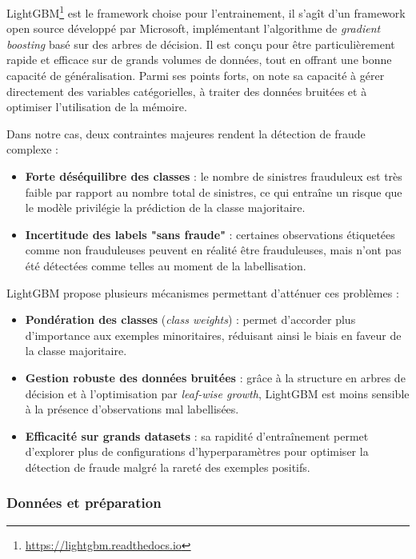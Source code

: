 \documentclass [twoside,openright,a4paper,11pt,french] {report}
\begin{document}
LightGBM\footnote{\url{https://lightgbm.readthedocs.io}} est le framework choise pour l'entrainement,
il s'agît d'un framework open source développé par Microsoft, implémentant l'algorithme de \textit{gradient boosting} 
basé sur des arbres de décision. Il est conçu pour être particulièrement rapide et efficace sur de grands volumes de données, 
tout en offrant une bonne capacité de généralisation. Parmi ses points forts, on note sa capacité à gérer directement des 
variables catégorielles, à traiter des données bruitées et à optimiser l'utilisation de la mémoire.

Dans notre cas, deux contraintes majeures rendent la détection de fraude complexe :
\begin{itemize}
    \item \textbf{Forte déséquilibre des classes} : le nombre de sinistres frauduleux est très faible par rapport au nombre total de sinistres, ce qui entraîne un risque que le modèle privilégie la prédiction de la classe majoritaire.
    \item \textbf{Incertitude des labels "sans fraude"} : certaines observations étiquetées comme non frauduleuses peuvent en réalité être frauduleuses, mais n'ont pas été détectées comme telles au moment de la labellisation.
\end{itemize}

LightGBM propose plusieurs mécanismes permettant d'atténuer ces problèmes :
\begin{itemize}
    \item \textbf{Pondération des classes} (\textit{class weights}) : permet d'accorder plus d'importance aux exemples minoritaires, réduisant ainsi le biais en faveur de la classe majoritaire.
    \item \textbf{Gestion robuste des données bruitées} : grâce à la structure en arbres de décision et à l'optimisation par \textit{leaf-wise growth}, LightGBM est moins sensible à la présence d'observations mal labellisées.
    \item \textbf{Efficacité sur grands datasets} : sa rapidité d'entraînement permet d'explorer plus de configurations d'hyperparamètres pour optimiser la détection de fraude malgré la rareté des exemples positifs.
\end{itemize}



\subsubsection{Données et préparation}
\end{document}

